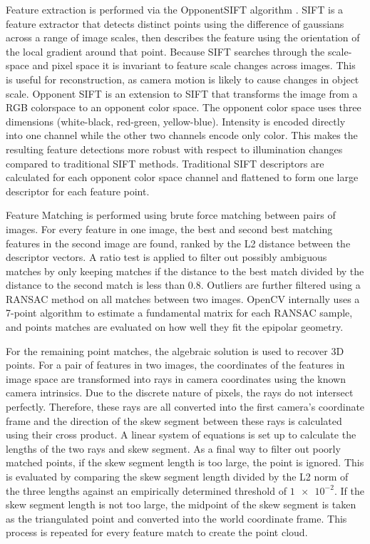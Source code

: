 \documentclass[12pt,letterpaper]{article} %
\begin{document}
Feature extraction is performed via the OpponentSIFT algorithm \cite{5204091}.  SIFT is a feature extractor that detects distinct points using the difference of gaussians across a range of image scales, then describes the feature using the orientation of the local gradient around that point.  Because SIFT searches through the scale-space and pixel space it is invariant to feature scale changes across images.  This is useful for reconstruction, as camera motion is likely to cause changes in object scale.  Opponent SIFT is an extension to SIFT that transforms the image from a RGB colorspace to an opponent color space. The opponent color space uses three dimensions (white-black, red-green, yellow-blue). Intensity is encoded directly into one channel while the other two channels encode only color. This makes the resulting feature detections more robust with respect to illumination changes compared to traditional SIFT methods. Traditional SIFT descriptors are calculated for each opponent color space channel and flattened to form one large descriptor for each feature point.

Feature Matching is performed using brute force matching between pairs of images. For every feature in one image, the best and second best matching features in the second image are found, ranked by the L2 distance between the descriptor vectors. A ratio test is applied to filter out possibly ambiguous matches by only keeping matches if the distance to the best match divided by the distance to the second match is less than 0.8.  Outliers are further filtered using a RANSAC method on all matches between two images. OpenCV internally uses a 7-point algorithm to estimate a fundamental matrix for each RANSAC sample, and points matches are evaluated on how well they fit the epipolar geometry.

For the remaining point matches, the algebraic solution is used to recover 3D points. For a pair of features in two images, the coordinates of the features in image space are transformed into rays in camera coordinates using the known camera intrinsics. Due to the discrete nature of pixels, the rays do not intersect perfectly. Therefore, these rays are all converted into the first camera’s coordinate frame and the direction of the skew segment between these rays is calculated using their cross product. A linear system of equations is set up to calculate the lengths of the two rays and skew segment. As a final way to filter out poorly matched points, if the skew segment length is too large, the point is ignored. This is evaluated by comparing the skew segment length divided by the L2 norm of the three lengths against an empirically determined threshold of $\num{1e-2}$. If the skew segment length is not too large, the midpoint of the skew segment is taken as the triangulated point and converted into the world coordinate frame.  This process is repeated for every feature match to create the point cloud.
\end{document}
